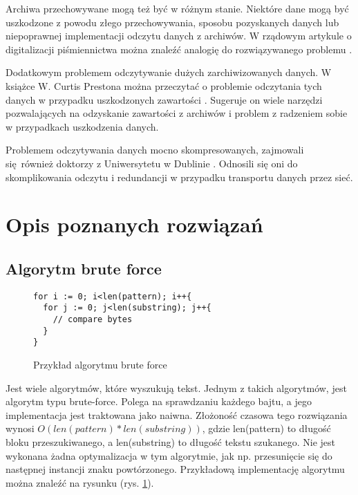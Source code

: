 Archiwa przechowywane mogą też być w różnym stanie. Niektóre dane mogą być
uszkodzone z powodu złego przechowywania, sposobu pozyskanych danych lub 
niepoprawnej implementacji odczytu danych z archiwów. W rządowym artykule o
digitalizacji piśmiennictwa można znaleźć analogię do rozwiązywanego problemu \cite{bib:internet:GovDigitalizacjaPiśmiennictwa}.

Dodatkowym problemem odczytywanie dużych zarchiwizowanych danych. W książce W.
Curtis Prestona można przeczytać o problemie odczytania tych danych w przypadku
uszkodzonych zawartości \cite{bib:ksiazka:ArchiwizacjaIOdzyskiwanie}. Sugeruje
on wiele narzędzi pozwalających na odzyskanie zawartości z archiwów i problem
z radzeniem sobie w przypadkach uszkodzenia danych.

Problemem odczytywania danych mocno skompresowanych, zajmowali się również 
doktorzy z Uniwersytetu w Dublinie \cite{bib:internet:KompresjaDanych}. Odnosili
się oni do skomplikowania odczytu i redundancji w przypadku transportu danych
przez sieć.

\section{Opis poznanych rozwiązań}

\subsection{Algorytm brute force}

\begin{figure}[htbp]
  \centering
  \begin{lstlisting}
for i := 0; i<len(pattern); i++{
  for j := 0; j<len(substring); j++{
    // compare bytes
  }
}
  \end{lstlisting}
  \caption{Przykład algorytmu brute force}
  \label{fig:code:bruteForceComparison}
\end{figure}

Jest wiele algorytmów, które wyszukują tekst. Jednym z takich algorytmów, jest 
algorytm typu brute-force. Polega na sprawdzaniu każdego bajtu, a jego implementacja
jest traktowana jako naiwna. Złożoność czasowa tego rozwiązania wynosi
$O(len(pattern) * len(substring))$, gdzie len(pattern) to długość bloku 
przeszukiwanego, a len(substring) to długość tekstu szukanego. Nie jest wykonana
żadna optymalizacja w tym algorytmie, jak np. przesunięcie się do następnej
 instancji znaku powtórzonego. Przykładową implementację algorytmu można znaleźć
  na rysunku (rys. \ref{fig:code:bruteForceComparison}).

